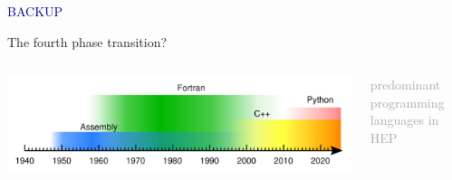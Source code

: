 \documentclass[aspectratio=169]{beamer}
\begin{document}

\begin{frame}{}
\huge
\vspace{1 cm}
\begin{center}
\textcolor{darkblue}{BACKUP}
\end{center}
\end{frame}


\begin{frame}{The fourth phase transition?}
\Large
\vspace{0.5 cm}
\begin{columns}
\includegraphics[width=\linewidth]{programming-languages.pdf}

\begin{center}
\vspace{-0.75 cm}
\textcolor{darkgray}{predominant programming languages in HEP}
\end{center}
\end{columns}
\end{frame}
\end{document}

